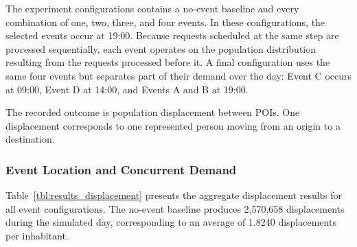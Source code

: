 The experiment configurations contains a no-event baseline and every combination of one, two, three, and four events. 
In these configurations, the selected events occur at 19:00. Because requests scheduled at the same step are processed sequentially, each event operates on the population distribution resulting from the requests processed before it. 
A final configuration uses the same four events but separates part of their demand over the day: Event C occurs at 09:00, Event D at 14:00, and Events A and B at 19:00.

The recorded outcome is population displacement between POIs. One displacement corresponds to one represented person moving from an origin to a destination. %


\subsubsection{Event Location and Concurrent Demand}
\label{sec:large_event_concurrent_demand}

Table~\ref{tbl:results_displacement} presents the aggregate displacement results for all event configurations. The no-event baseline produces 2,570,658 displacements during the simulated day, corresponding to an average of 1.8240 displacements per inhabitant.


